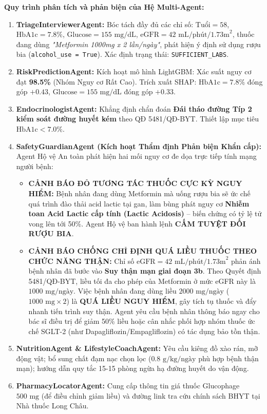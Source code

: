 \documentclass[12pt,a4paper]{article}
\begin{document}
\textbf{Quy trình phân tích và phản biện của Hệ Multi-Agent:}
\begin{enumerate}[leftmargin=1.2cm]
    \item \textbf{TriageInterviewerAgent:} Bóc tách đầy đủ các chỉ số: $\text{Tuổi} = 58$, $\text{HbA1c} = 7.8\%$, $\text{Glucose} = 155\text{ mg/dL}$, $\text{eGFR} = 42\text{ mL/phút/1.73m}^2$, thuốc đang dùng \textit{"Metformin 1000mg x 2 lần/ngày"}, phát hiện ý định sử dụng rượu bia (\texttt{alcohol\_use = True}). Xác định trạng thái: \texttt{SUFFICIENT\_LABS}.
    \item \textbf{RiskPredictionAgent:} Kích hoạt mô hình LightGBM: Xác suất nguy cơ đạt \textbf{98.5\%} (Nhóm Nguy cơ Rất Cao). Trích xuất SHAP: $\text{HbA1c} = 7.8\%$ đóng góp $+0.43$, $\text{Glucose} = 155\text{ mg/dL}$ đóng góp $+0.33$.
    \item \textbf{EndocrinologistAgent:} Khẳng định chẩn đoán \textbf{Đái tháo đường Típ 2 kiểm soát đường huyết kém} theo QĐ 5481/QĐ-BYT. Thiết lập mục tiêu $\text{HbA1c} < 7.0\%$.
    \item \textbf{SafetyGuardianAgent (Kích hoạt Thẩm định Phản biện Khẩn cấp):}
    Agent Hộ vệ An toàn phát hiện hai mối nguy cơ đe dọa trực tiếp tính mạng người bệnh:
    \begin{itemize}[leftmargin=0.8cm]
        \item \textbf{CẢNH BÁO ĐỎ TƯƠNG TÁC THUỐC CỰC KỲ NGUY HIỂM:} Bệnh nhân đang dùng Metformin mà uống rượu bia sẽ ức chế quá trình đào thải acid lactic tại gan, làm bùng phát nguy cơ \textbf{Nhiễm toan Acid Lactic cấp tính (Lactic Acidosis)} -- biến chứng có tỷ lệ tử vong lên tới 50\%. Agent Hộ vệ ban hành lệnh \textbf{CẤM TUYỆT ĐỐI RƯỢU BIA}.
        \item \textbf{CẢNH BÁO CHỐNG CHỈ ĐỊNH QUÁ LIỀU THUỐC THEO CHỨC NĂNG THẬN:} Chỉ số $\text{eGFR} = 42\text{ mL/phút/1.73m}^2$ phản ánh bệnh nhân đã bước vào \textbf{Suy thận mạn giai đoạn 3b}. Theo Quyết định 5481/QĐ-BYT, liều tối đa cho phép của Metformin ở mức eGFR này là $1000\text{ mg/ngày}$. Việc bệnh nhân đang dùng liều $2000\text{ mg/ngày}$ ($1000\text{ mg} \times 2$) là \textbf{QUÁ LIỀU NGUY HIỂM}, gây tích tụ thuốc và đẩy nhanh tiến trình suy thận. Agent yêu cầu bệnh nhân thông báo ngay cho bác sĩ điều trị để giảm 50\% liều hoặc cân nhắc phối hợp nhóm thuốc ức chế SGLT-2 (như Dapagliflozin/Empagliflozin) có tác dụng bảo tồn thận.
    \end{itemize}
    \item \textbf{NutritionAgent \& LifestyleCoachAgent:} Yêu cầu kiêng đồ xào rán, mỡ động vật; bổ sung chất đạm nạc chọn lọc ($0.8\text{ g/kg/ngày}$ phù hợp bệnh thận mạn); hướng dẫn quy tắc 15-15 phòng ngừa hạ đường huyết do vận động.
    \item \textbf{PharmacyLocatorAgent:} Cung cấp thông tin giá thuốc Glucophage $500\text{ mg}$ (để điều chỉnh giảm liều) và đường link tra cứu chính sách BHYT tại Nhà thuốc Long Châu.
\end{enumerate}
\end{document}
